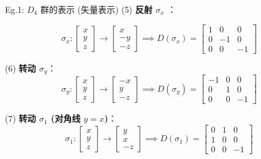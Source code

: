\begin{example}{Eg.1: $D_4$ 群的表示 (矢量表示)}
    (5) \textbf{反射 $\sigma_x$ }：
    
    
    \begin{equation}
        \sigma_x: \begin{bmatrix} x \\ y \\ z \end{bmatrix} \to \begin{bmatrix} x \\ -y \\ -z \end{bmatrix} \implies D(\sigma_x) = \begin{bmatrix} 1 & 0 & 0 \\ 0 & -1 & 0 \\ 0 & 0 & -1 \end{bmatrix}
    \end{equation}
    

    (6) \textbf{转动 $\sigma_y$}：
    \begin{equation}
        \sigma_y: \begin{bmatrix} x \\ y \\ z \end{bmatrix} \to \begin{bmatrix} -x \\ y \\ -z \end{bmatrix} \implies D(\sigma_y) = \begin{bmatrix} -1 & 0 & 0 \\ 0 & 1 & 0 \\ 0 & 0 & -1 \end{bmatrix}
    \end{equation}
    
    (7) \textbf{转动 $\sigma_1$ (对角线 $y=x$)}：
    \begin{equation}
        \sigma_1: \begin{bmatrix} x \\ y \\ z \end{bmatrix} \to \begin{bmatrix} y \\ x \\ -z \end{bmatrix} \implies D(\sigma_1) = \begin{bmatrix} 0 & 1 & 0 \\ 1 & 0 & 0 \\ 0 & 0 & -1 \end{bmatrix}
    \end{equation}
    


\end{example}

